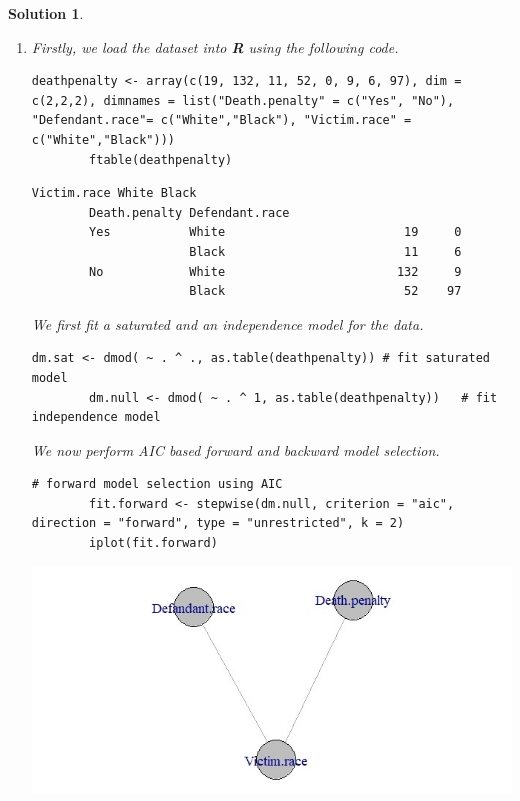 \documentclass[12pt]{article}
\theoremstyle{problemstyle}
\newtheorem*{solution*}{Solution}
\begin{document}
\begin{solution*}
\begin{enumerate}
	
	\item[(ii)] Firstly, we load the dataset into \textbf{R} using the following code.
	
	\begin{lstlisting}[style = R-code]
		deathpenalty <- array(c(19, 132, 11, 52, 0, 9, 6, 97), dim = c(2,2,2), dimnames = list("Death.penalty" = c("Yes", "No"), "Defendant.race"= c("White","Black"), "Victim.race" = c("White","Black")))
		ftable(deathpenalty)
	\end{lstlisting}
	
	\begin{lstlisting}[style = R-output]
		                             Victim.race White Black
		Death.penalty Defendant.race                        
		Yes           White                         19     0
					  Black                         11     6
		No            White                        132     9
					  Black                         52    97
	\end{lstlisting}
	We first fit a saturated and an independence model for the data.
	
	\begin{lstlisting}[style = R-code]
		dm.sat <- dmod( ~ . ^ ., as.table(deathpenalty)) # fit saturated model
		dm.null <- dmod( ~ . ^ 1, as.table(deathpenalty))   # fit independence model
	\end{lstlisting}
	
	We now perform AIC based forward and backward model selection.
	
	\begin{lstlisting}[style = R-code]
		# forward model selection using AIC
		fit.forward <- stepwise(dm.null, criterion = "aic", direction = "forward", type = "unrestricted", k = 2)
		iplot(fit.forward)
	\end{lstlisting}
	 
	 \includegraphics[width=\linewidth]{dp-aic-forward.jpeg}
	 

\end{enumerate}
\end{solution*}
\end{document}
